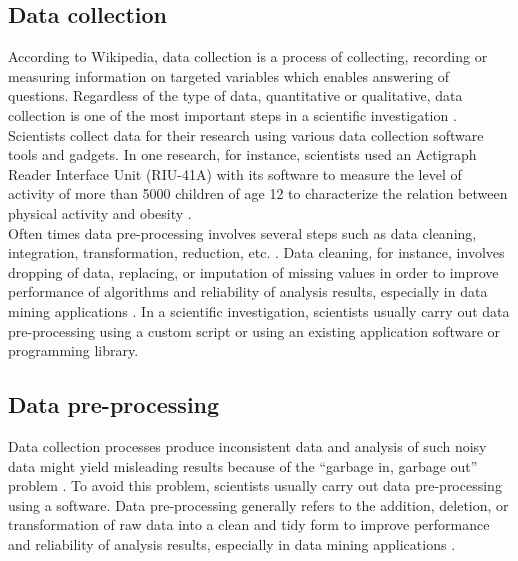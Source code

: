 \subsection{Data collection}
\label{sec:purpose:Types:datacollection}


According to Wikipedia, data collection is a process of collecting, recording or measuring information on targeted variables which enables answering of questions. Regardless of the type of data, quantitative or qualitative, data collection is one of the most important steps in a scientific investigation \citep{enwiki:1049936190}. \\

Scientists collect data for their research using various data collection software tools and gadgets. In one research, for instance, scientists used an Actigraph Reader Interface Unit (RIU-41A) with its software to measure the level of activity of more than 5000 children of age 12 to characterize the relation between physical activity and obesity \citep{ness2007objectively,ibanez2018survey}. \\

Often times data pre-processing involves several steps such as data cleaning, integration, transformation, reduction, etc. \citep{malley2016data}. Data cleaning, for instance, involves dropping of data, replacing, or imputation of missing values in order to improve performance of algorithms and reliability of analysis results, especially in data mining applications \citep{enwiki:1051181443, enwiki:1056727993}. In a scientific investigation, scientists usually carry out data pre-processing using a custom script or using an existing application software or programming library. \\

\subsection{Data pre-processing}
\label{sec:purpose:Types:prepro}

Data collection processes produce inconsistent data and analysis of such noisy data might yield misleading results because of the “garbage in, garbage out” problem \citep{enwiki:1059558941}. To avoid this problem, scientists usually carry out data pre-processing using a software. Data pre-processing generally refers to the addition, deletion, or transformation of raw data into a clean and tidy form to improve performance and reliability of analysis results, especially in data mining applications \citep{kuhn2013data,rinnan2009data}. \\

